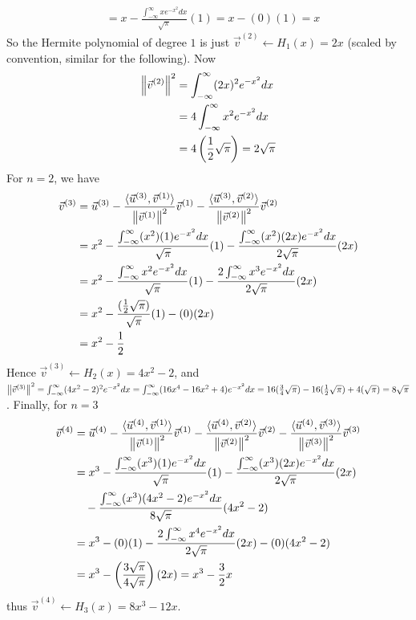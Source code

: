 \begin{solution}
\begin{align*}
&= x - \frac{\int_{-\infty}^{\infty} xe^{-x^2} dx}{\sqrt{\pi}} (1) = x - (0)(1) = x
\end{align*}
So the Hermite polynomial of degree $1$ is just $\vec{v}^{(2)} \leftarrow H_1(x) = 2x$ (scaled by convention, similar for the following). Now
\begin{align*}
\norm{\vec{v}^{(2)}}^2 &= \int_{-\infty}^{\infty} (2x)^2 e^{-x^2} dx \\
&= 4\int_{-\infty}^{\infty} x^2 e^{-x^2} dx \\
&= 4\left(\frac{1}{2}\sqrt{\pi}\right) = 2\sqrt{\pi}
\end{align*}
For $n=2$, we have
\begin{align*}
\vec{v}^{(3)} &= \vec{u}^{(3)} - \frac{\langle\vec{u}^{(3)}, \vec{v}^{(1)}\rangle}{\norm{\vec{v}^{(1)}}^2} \vec{v}^{(1)} - \frac{\langle\vec{u}^{(3)}, \vec{v}^{(2)}\rangle}{\norm{\vec{v}^{(2)}}^2} \vec{v}^{(2)} \\
&= x^2 - \frac{\int_{-\infty}^{\infty} (x^2)(1) e^{-x^2} dx}{\sqrt{\pi}} (1) - \frac{\int_{-\infty}^{\infty} (x^2)(2x) e^{-x^2} dx}{2\sqrt{\pi}} (2x) \\
&= x^2 - \frac{\int_{-\infty}^{\infty} x^2 e^{-x^2} dx}{\sqrt{\pi}} (1) - \frac{2 \int_{-\infty}^{\infty} x^3 e^{-x^2} dx}{2\sqrt{\pi}} (2x) \\
&= x^2 - \frac{(\frac{1}{2}\sqrt{\pi})}{\sqrt{\pi}} (1) - (0) (2x) \\
&= x^2 - \frac{1}{2}
\end{align*}
Hence $\vec{v}^{(3)} \leftarrow H_2(x) = 4x^2 - 2$, and $\norm{\vec{v}^{(3)}}^2 = \int_{-\infty}^{\infty} (4x^2 - 2)^2 e^{-x^2} dx = \int_{-\infty}^{\infty} (16 x^4 - 16 x^2 + 4)e^{-x^2} dx = 16(\frac{3}{4}\sqrt{\pi}) - 16(\frac{1}{2}\sqrt{\pi}) + 4(\sqrt{\pi}) = 8\sqrt{\pi}$. Finally, for $n=3$
\begin{align*}
\vec{v}^{(4)} &= \vec{u}^{(4)} - \frac{\langle\vec{u}^{(4)}, \vec{v}^{(1)}\rangle}{\norm{\vec{v}^{(1)}}^2} \vec{v}^{(1)} - \frac{\langle\vec{u}^{(4)}, \vec{v}^{(2)}\rangle}{\norm{\vec{v}^{(2)}}^2} \vec{v}^{(2)} - \frac{\langle\vec{u}^{(4)}, \vec{v}^{(3)}\rangle}{\norm{\vec{v}^{(3)}}^2} \vec{v}^{(3)}\\  
&= x^3 - \frac{\int_{-\infty}^{\infty} (x^3)(1) e^{-x^2} dx}{\sqrt{\pi}} (1) - \frac{\int_{-\infty}^{\infty} (x^3)(2x) e^{-x^2} dx}{2\sqrt{\pi}} (2x) \\
&\quad - \frac{\int_{-\infty}^{\infty} (x^3)(4x^2 - 2) e^{-x^2} dx}{8\sqrt{\pi}} (4x^2 - 2) \\
&= x^3 - (0)(1) - \frac{2\int_{-\infty}^{\infty} x^4 e^{-x^2} dx}{2\sqrt{\pi}} (2x) - (0)(4x^2 - 2) \\
&= x^3 - \left(\frac{3\sqrt{\pi}}{4\sqrt{\pi}}\right)(2x) = x^3 - \frac{3}{2}x
\end{align*}
thus $\vec{v}^{(4)} \leftarrow H_3(x) = 8x^3 - 12x$.
\end{solution}

